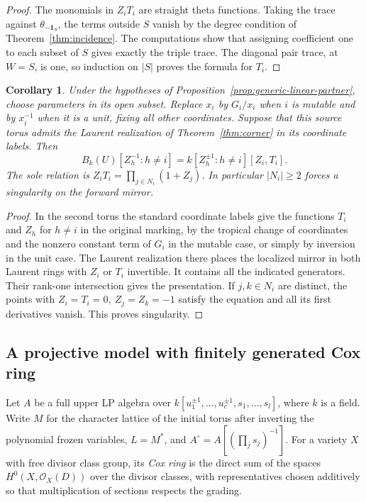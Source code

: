\documentclass[11pt,reqno]{amsart}
\numberwithin{equation}{section}
\newtheorem{corollary}[theorem]{Corollary}
\theoremstyle{definition}
\theoremstyle{remark}
\begin{document}
\begin{proof}
The monomials in \(Z_iT_i\) are straight theta functions.
Taking the trace against \(\theta_{-\mathbf1_S}\), the terms outside
\(S\) vanish by the degree condition of Theorem~\ref{thm:incidence}. The computations show that
assigning coefficient one to each subset of \(S\) gives exactly the
triple trace. The diagonal pair trace, at \(W=S\), is one, so induction
on \(|S|\) proves the formula for \(T_i\).

\end{proof}

\begin{corollary}\label{cor:generic-linear-exchange-singularity}
Under the hypotheses of Proposition~\ref{prop:generic-linear-partner}, choose parameters in its open subset.
Replace \(x_i\) by \(G_i/x_i\) when \(i\) is mutable and by
\(x_i^{-1}\) when it is a unit, fixing all other coordinates.
Suppose that this source torus admits the Laurent realization of
Theorem~\ref{thm:corner} in its coordinate labels.
Then
\[ B_k(U)[Z_h^{-1}:h\ne i] =k[Z_h^{\pm1}:h\ne i][Z_i,T_i]. \]
The sole relation is \(Z_i T_i=\prod_{j\in N_i}(1+Z_j)\).
In particular \(|N_i|\ge2\) forces a singularity on the forward mirror.
\end{corollary}
\begin{proof}
In the second torus the standard coordinate labels give
the functions \(T_i\) and \(Z_h\) for \(h\ne i\) in the original marking, by the tropical
change of coordinates and the nonzero constant term of \(G_i\) in
the mutable case, or simply by inversion in the unit case.
The Laurent realization there places the localized mirror in
both Laurent rings with \(Z_i\) or \(T_i\) invertible. It contains
all the indicated generators. Their rank-one intersection gives the
presentation. If \(j,k\in N_i\) are distinct, the points with
\(Z_i=T_i=0,\ Z_j=Z_k=-1\) satisfy the equation and all its first
derivatives vanish. This proves singularity.
\end{proof}

\subsection{A projective model with finitely generated Cox ring}

Let \(A\) be a full upper LP algebra over
\(k[u_1^{\pm1},\ldots,u_c^{\pm1},s_1,\ldots,s_l]\),
where \(k\) is a field. Write \(M\) for the character lattice of the
initial torus after inverting the polynomial frozen variables,
\(L=M^*\), and \(A^\circ=A[(\prod_j s_j)^{-1}]\).
For a variety \(X\) with free divisor class group, its \emph{Cox ring}
is the direct sum of the spaces \(H^0(X,\mathcal O_X(D))\) over the
divisor classes, with representatives chosen additively so that
multiplication of sections respects the grading.
\end{document}
